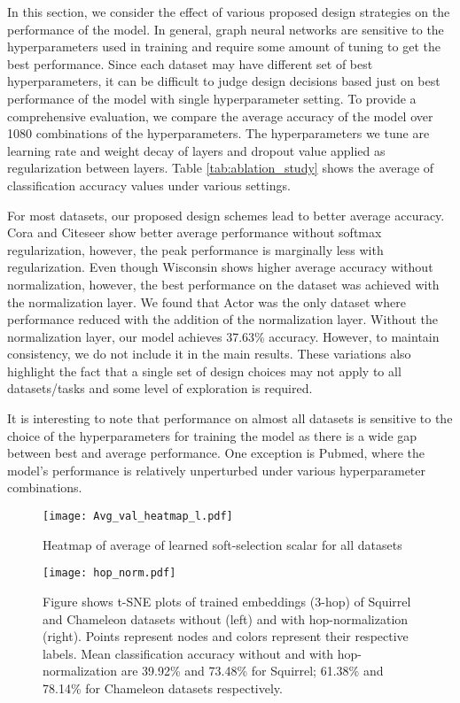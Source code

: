 \documentclass[sigconf,natbib=false]{acmart}
\begin{document}
In this section, we consider the effect of various proposed design strategies on the performance of the model. In general, graph neural networks are sensitive to the hyperparameters used in training and require some amount of tuning to get the best performance. Since each dataset may have different set of best hyperparameters, it can be difficult to judge design decisions based just on best performance of the model with single hyperparameter setting. To provide a comprehensive evaluation, we compare the average accuracy of the model over 1080 combinations of the hyperparameters. The hyperparameters we tune are learning rate and weight decay of layers and dropout value applied as regularization between layers.  Table \ref{tab:ablation_study} shows the average of classification accuracy values under various settings.

For most datasets, our proposed design schemes lead to better average accuracy. Cora and Citeseer show better average performance without softmax regularization, however, the peak performance is marginally less with regularization. Even though Wisconsin shows higher average accuracy without normalization, however, the best performance on the dataset was achieved with the normalization layer. We found that Actor was the only dataset where performance reduced with the addition of the normalization layer. Without the normalization layer, our model achieves 37.63\% accuracy. However, to maintain consistency, we do not include it in the main results. These variations also highlight the fact that a single set of design choices may not apply to all datasets/tasks and some level of exploration is required.


It is interesting to note that performance on almost all datasets is sensitive to the choice of the hyperparameters for training the model as there is a wide gap between best and average performance. One exception is Pubmed, where the model's performance is relatively unperturbed under various hyperparameter combinations. 

\begin{figure}[h]
    \centering
    \texttt{[image: Avg\_val\_heatmap\_l.pdf]}
    \caption{Heatmap of average of learned soft-selection scalar for all datasets}
    \label{fig:scalar_val_heat}
\end{figure}








\begin{figure*}
    \centering
    \texttt{[image: hop\_norm.pdf]}
    \caption{Figure shows t-SNE plots of trained embeddings (3-hop) of Squirrel and Chameleon datasets without (left) and with hop-normalization (right). Points represent nodes and colors represent their respective labels. Mean classification accuracy without and with hop-normalization are 39.92\% and 73.48\% for Squirrel; 61.38\% and 78.14\% for Chameleon datasets respectively.    }
    \label{fig:hop_norm}
\end{figure*}
\end{document}
